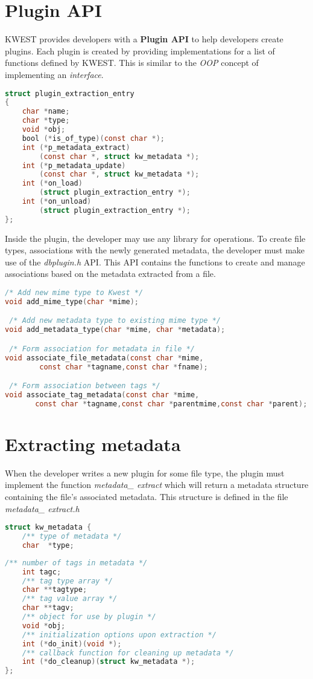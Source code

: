 \section{Plugin API}
KWEST provides developers with a \textbf{Plugin API} to help developers create plugins. Each plugin is created by providing implementations for a list of functions defined by KWEST. This is similar to the \textit{OOP} concept of implementing an \textit{interface}.
\begin{lstlisting}[language=C,frame=single]
struct plugin_extraction_entry
{
	char *name;
	char *type;
	void *obj;
	bool (*is_of_type)(const char *);
	int (*p_metadata_extract)
		(const char *, struct kw_metadata *);
	int (*p_metadata_update)
		(const char *, struct kw_metadata *);
	int (*on_load)
		(struct plugin_extraction_entry *);
	int (*on_unload)
		(struct plugin_extraction_entry *);
};
\end{lstlisting}

Inside the plugin, the developer may use any library for operations. To create file types, associations with the newly generated metadata, the developer must make use of the \textit{dbplugin.h} API. This API contains the functions to create and manage associations based on the metadata extracted from a file.

\begin{lstlisting}[language=C,frame=single]
 /* Add new mime type to Kwest */
void add_mime_type(char *mime);

 /* Add new metadata type to existing mime type */
void add_metadata_type(char *mime, char *metadata);

 /* Form association for metadata in file */
void associate_file_metadata(const char *mime,
		const char *tagname,const char *fname);

 /* Form association between tags */
void associate_tag_metadata(const char *mime,
       const char *tagname,const char *parentmime,const char *parent);
\end{lstlisting}

\section{Extracting metadata}
When the developer writes a new plugin for some file type, the plugin must implement the  function \textit{metadata\_ extract} which will return a metadata structure containing the file's associated metadata. This structure is defined in the file \textit{metadata\_ extract.h}
\begin{lstlisting}[language=C,frame=single]
struct kw_metadata {
	/** type of metadata */
	char  *type; 
\end{lstlisting}
\begin{lstlisting}[language=C,frame=single]
	/** number of tags in metadata */
	int tagc; 
	/** tag type array */
	char **tagtype; 
	/** tag value array */
	char **tagv; 
	/** object for use by plugin */
	void *obj; 
	/** initialization options upon extraction */
	int (*do_init)(void *); 
	/** callback function for cleaning up metadata */
	int (*do_cleanup)(struct kw_metadata *); 
};
\end{lstlisting}

